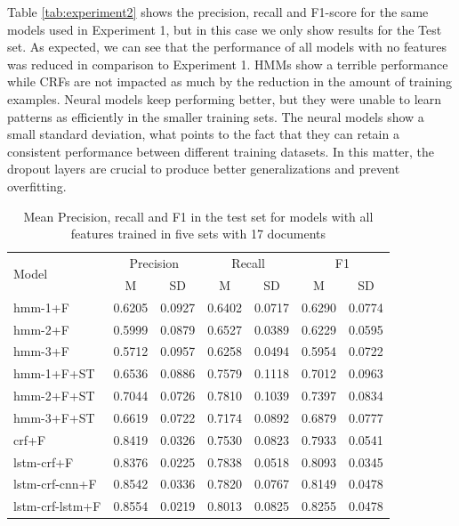 \documentclass[sigconf]{acmart}
\begin{document}
Table \ref{tab:experiment2} shows the precision, recall and F1-score for the same models
used in Experiment 1, but in this case we only show results for the Test set.
As expected, we can see that the performance of all models with no features was reduced in comparison 
to Experiment 1. HMMs show a terrible performance while CRFs are not 
impacted as much by the reduction in the amount of training examples. Neural models
keep performing better, but they were unable to learn patterns as efficiently in
the smaller training sets. The neural models show a small standard deviation, what
points to the fact that they can retain a consistent performance between different training 
datasets. In this matter, the dropout layers are crucial to produce better generalizations 
and prevent overfitting.

\begin{table}[h]
  \small
  \begin{center}
    \begin{tabular}{lllllll}
      \toprule
      \multirow{2}{*}{Model} & \multicolumn{2}{c}{Precision} & \multicolumn{2}{c}{Recall} & \multicolumn{2}{c}{F1} \\
                             & \multicolumn{1}{c}{\tiny{M}} & \multicolumn{1}{c}{\tiny{SD}}
			     & \multicolumn{1}{c}{\tiny{M}} & \multicolumn{1}{c}{\tiny{SD}}
			     & \multicolumn{1}{c}{\tiny{M}} & \multicolumn{1}{c}{\tiny{SD}} \\
      \midrule
      hmm-1+F	      & 0.6205 & 0.0927 & 0.6402 & 0.0717 & 0.6290 & 0.0774 \\
      hmm-2+F	      & 0.5999 & 0.0879 & 0.6527 & 0.0389 & 0.6229 & 0.0595 \\
      hmm-3+F	      & 0.5712 & 0.0957 & 0.6258 & 0.0494 & 0.5954 & 0.0722 \\
      hmm-1+F+ST      & 0.6536 & 0.0886 & 0.7579 & 0.1118 & 0.7012 & 0.0963 \\
      hmm-2+F+ST      & 0.7044 & 0.0726 & 0.7810 & 0.1039 & 0.7397 & 0.0834 \\
      hmm-3+F+ST      & 0.6619 & 0.0722 & 0.7174 & 0.0892 & 0.6879 & 0.0777 \\
      crf+F	      & 0.8419 & 0.0326 & 0.7530 & 0.0823 & 0.7933 & 0.0541 \\
      lstm-crf+F      & 0.8376 & 0.0225 & 0.7838 & 0.0518 & 0.8093 & 0.0345 \\
      lstm-crf-cnn+F  & 0.8542 & 0.0336 & 0.7820 & 0.0767 & 0.8149 & 0.0478 \\
      lstm-crf-lstm+F & 0.8554 & 0.0219 & 0.8013 & 0.0825 & 0.8255 & 0.0478 \\
      \bottomrule
    \end{tabular}
  \end{center}
  \caption{Mean Precision, recall and F1 in the test set for models with all features
   trained in five sets with 17 documents}
  \label{tab:experiment2f}
\end{table}
\end{document}
